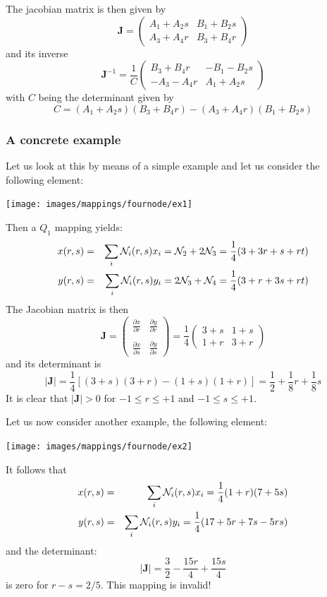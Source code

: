 The jacobian matrix is then given by
\[
{\bm J} = \left(
\begin{array}{cc}
A_1 + A_2s & B_1 + B_2s \\
A_3 + A_4r & B_3 + B_4r
\end{array}
\right)
\]
and its inverse
\[
{\bm J}^{-1} = \frac{1}{C}
\left(
\begin{array}{cc}
B_3 + B_4r & -B_1 - B_2s \\
-A_3 - A_4r & A_1 + A_2s
\end{array}
\right)
\]
with $C$ being the determinant given by
\[
C= (A_1 + A_2s)(B_3 + B_4r)-(A_3 + A_4r)(B_1 + B_2s)
\]


\subsubsection{A concrete example}

Let us look at this by means of a simple example and let us consider the following 
element:
\begin{center}
\texttt{[image: images/mappings/fournode/ex1]}
\end{center}
Then a $Q_1$ mapping yields:
\begin{eqnarray}
x(r,s) &=& \sum_i {\mathcal{N}}_i(r,s) x_i = {\mathcal{N}}_2 + 2{\mathcal{N}}_3 = \frac{1}{4} (3+3r+ s+rt) \nonumber\\
y(r,s) &=& \sum_i {\mathcal{N}}_i(r,s) y_i = 2{\mathcal{N}}_3 + {\mathcal{N}}_4 = \frac{1}{4} (3+r+ 3s+rt) 
\end{eqnarray}
The Jacobian matrix is then
\begin{equation}
{\bm J} = 
\left(
\begin{array}{cc}
\frac{\partial x}{\partial r} & \frac{\partial y}{\partial r} \nonumber\\ \\
\frac{\partial x}{\partial s} & \frac{\partial y}{\partial s} \nonumber
\end{array}
\right)
=
\frac{1}{4}
\left(
\begin{array}{cc}
3+s & 1+s \\
1+r & 3+r
\end{array}
\right)
\end{equation}
and its determinant is 
\begin{equation}
|{\bm J}|=\frac{1}{4} [(3+s)(3+r)-(1+s)(1+r)]=\frac{1}{2}+\frac{1}{8}r+\frac{1}{8}s
\end{equation}
It is clear that $|{\bm J}|>0$ for $-1\leq r \leq +1$ and $-1\leq s \leq +1$. 

Let us now consider another example, the following element:
\begin{center}
\texttt{[image: images/mappings/fournode/ex2]}
\end{center}
It follows that
\begin{eqnarray}
x(r,s) &=& \sum_i {\mathcal{N}}_i(r,s) x_i = \frac{1}{4}(1+r)(7+5s) \\ 
y(r,s) &=& \sum_i {\mathcal{N}}_i(r,s) y_i = \frac{1}{4}(17+5r+7s-5rs)
\end{eqnarray}
and the determinant:
\[
|{\bm J}|=\frac{3}{2}-\frac{15r}{4}+\frac{15s}{4}
\]
is zero for $r-s=2/5$. This mapping is invalid!



